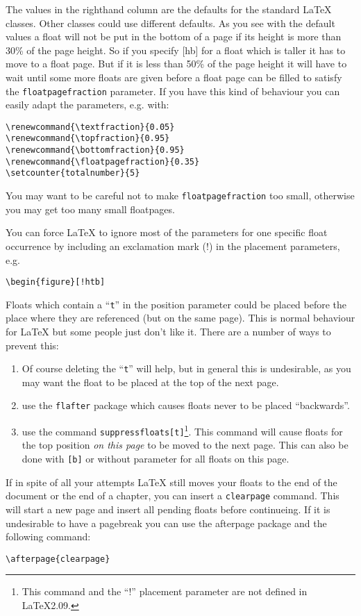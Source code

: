 \documentclass[a4paper]{article}
\def\latex/{\protect\LaTeX{}}
\newcommand{\bs}{\symbol{'134}}
\newcommand{\Cmd}[1]{\texttt{\def\{{\char`\{}\def\}{\char`\}}\bs#1}}
\renewcommand{\topfraction}{0.9}
\renewcommand{\bottomfraction}{0.9}
\renewcommand{\textfraction}{0.05}
\begin{document}
The values in the righthand column are the defaults for the standard
\latex/ classes. Other classes could use different defaults. As you see
with the default values a float will not be put in the bottom of a page if
its height is more than 30\% of the page height. So if you specify [hb] for
a float which is taller it has to move to a float page. But if it is less
than 50\% of the page height it will have to wait until some more floats
are given before a float page can be filled to satisfy the
\Cmd{floatpagefraction} parameter. If you have this kind of behaviour you
can easily adapt the parameters, e.g. with:
\begin{verbatim}
\renewcommand{\textfraction}{0.05}
\renewcommand{\topfraction}{0.95}
\renewcommand{\bottomfraction}{0.95}
\renewcommand{\floatpagefraction}{0.35}
\setcounter{totalnumber}{5}
\end{verbatim}
You may want to be careful not to make \Cmd{floatpagefraction} too small,
otherwise you may get too many small floatpages.

You can force \latex/ to ignore most of the parameters for one specific float
occurrence by
including an exclamation mark (!) in the placement parameters, e.g.
\begin{verbatim}
\begin{figure}[!htb]
\end{verbatim}

Floats which contain a ``\texttt{t}'' in the position parameter could be
placed before the place where they are referenced (but on the same page).
This is normal behaviour for \latex/ but some people just don't like it.
There are a number of ways to prevent this:
\begin{enumerate}
\item Of course deleting the ``\texttt{t}'' will help, but in general this is
  undesirable, as you may want the float to be placed at the top of the
  next page.
\item use the \texttt{flafter} package which causes floats never to be
  placed ``backwards''.
\item use the command \Cmd{suppressfloats[t]}\footnote{This command and the
    ``!'' placement parameter are not defined in \LaTeX2.09.}.  This
  command will cause floats for the top position \emph{on this page} to be
  moved to the next page. This can also be done with \texttt{[b]} or
  without parameter for all floats on this page.
\end{enumerate}

If in spite of all your attempts \latex/ still moves your floats to the end
of the document or the end of a chapter, you can insert a \Cmd{clearpage}
command. This will start a new page and insert all pending floats before
continueing. If it is undesirable to have a pagebreak you can use the
\textsf{afterpage} package and the following command:
\begin{verbatim}
\afterpage{clearpage}
\end{verbatim}
\end{document}
